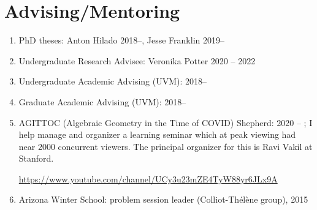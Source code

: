 \documentclass[a4paper,10pt]{article}
\begin{document}
\section*{Advising/Mentoring}
\begin{enumerate}
	\item PhD theses: Anton Hilado 2018--, Jesse Franklin 2019--
	\item Undergraduate Research Advisee: Veronika Potter  2020 -- 2022
	\item Undergraduate Academic Advising (UVM): 2018--
	\item Graduate Academic Advising (UVM): 2018--
	\item AGITTOC (Algebraic Geometry in the Time of COVID) Shepherd: 2020 -- ; I help manage and organizer a learning seminar which at peak viewing had near 2000 concurrent viewers. The principal organizer for this is Ravi Vakil at Stanford.
	\begin{center}
			 \url{https://www.youtube.com/channel/UCy3u23mZE4TyW88yr6JLx9A}
	\end{center}
   \item  Arizona Winter School:  problem session leader (Colliot-Th\'{e}l\`ene group),  2015  

\end{enumerate}


\iffalse
\end{document}
